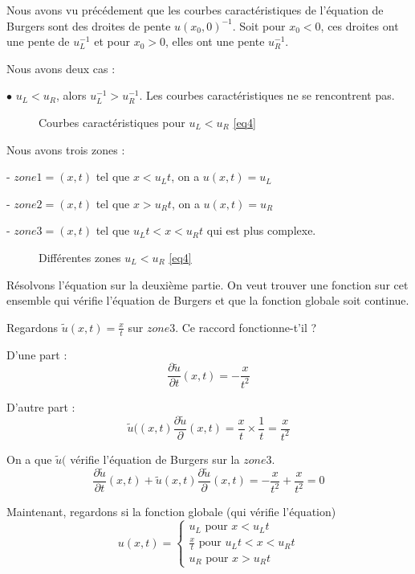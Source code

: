 \documentclass{article}
\begin{document}
Nous avons vu précédement que les courbes caractéristiques de l'équation de Burgers sont des droites de pente $u(x_0,0)^{-1}$. Soit pour $x_0<0$, ces droites ont une pente de $u_L^{-1}$ et pour $x_0>0$, elles ont une pente $u_R^{-1}$.
\newline

Nous avons deux cas :

$\bullet$ $u_L < u_R$, alors $u_L^{-1} > u_R^{-1}$. Les courbes caractéristiques ne se rencontrent pas.

\begin{figure}[H]
  
  \caption{Courbes caractéristiques pour $u_L < u_R$ \ref{eq4}}
\end{figure}

Nous avons trois zones :

- $zone1 = (x,t)$ tel que $x < u_L t$, on a $u(x,t) = u_L$

- $zone2 = (x,t)$ tel que $x > u_R t$, on a $u(x,t) = u_R$

- $zone3 = (x,t)$ tel que $u_L t < x < u_R t$ qui est plus complexe.

\begin{figure}[H]
  
  \caption{Différentes zones $u_L < u_R$ \ref{eq4}}
\end{figure}

Résolvons l'équation sur la deuxième partie. On veut trouver une fonction sur cet ensemble qui vérifie l'équation de Burgers et que la fonction globale soit continue.

Regardons $\tilde{u}(x,t) = \frac{x}{t}$ sur $zone3$. Ce raccord fonctionne-t'il ?

D'une part :
\[ \frac{\partial \tilde{u}}{\partial t}(x,t) = -\frac{x}{t^2} \]


D'autre part :
\[ \tilde{u}((x,t) \frac{\partial \tilde{u}}{\partial}(x,t) = \frac{x}{t} \times \frac{1}{t} = \frac{x}{t^2} \]

On a que $\tilde{u}($ vérifie l'équation de Burgers sur la $zone3$.
\[ \frac{\partial \tilde{u}}{\partial t}(x,t) + \tilde{u}(x,t) \frac{\partial \tilde{u}}{\partial}(x,t) = -\frac{x}{t^2} + \frac{x}{t^2} = 0 \]

Maintenant, regardons si la fonction globale  (qui vérifie l'équation)
\[
u(x,t) = \left\{ \begin{matrix}
			u_L \text{ pour } x < u_L t \\
			\frac{x}{t} \text{ pour } u_L t < x < u_R t \\
			u_R \text{ pour } x > u_R t
\end{matrix} \right.
\tag{Sol4.1}
\]
\end{document}
